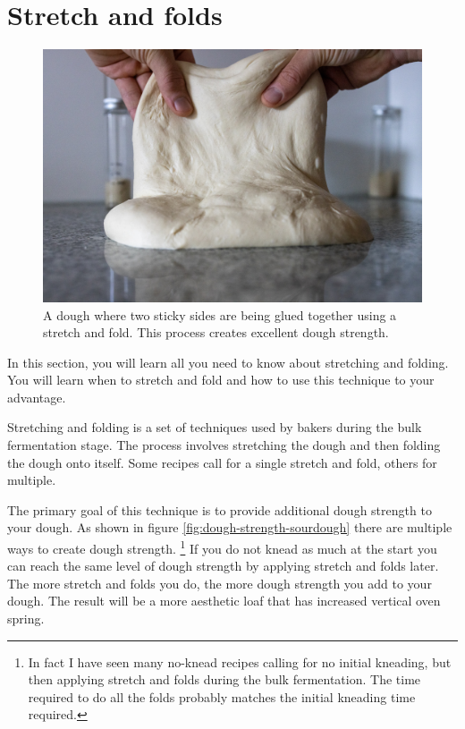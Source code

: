 \section{Stretch and folds}

\begin{figure}[!htb]
  \includegraphics[width=\textwidth]{dough-being-glued}
  \caption{A dough where two sticky sides are being glued together using
  a stretch and fold. This process creates excellent dough strength.}
\end{figure}

In this section, you will learn all you need to know about stretching and
folding. You will learn when to stretch and fold and how to use this technique
to your advantage.

Stretching and folding is a set of techniques used by bakers during the bulk
fermentation stage. The process involves stretching the dough and then
folding the dough onto itself. Some recipes call for a single stretch
and fold, others for multiple.

The primary goal of this technique is to provide
additional dough strength to your dough. As shown in figure \ref{fig:dough-strength-sourdough}
there are multiple ways to create dough strength. \footnote{In fact I have seen many no-knead
recipes calling for no initial kneading, but then applying stretch and folds
during the bulk fermentation. The time required to do all the folds probably
matches the initial kneading time required.} If you do not knead as much at
the start you can reach the same level of dough strength by applying stretch
and folds later. The more stretch and folds you do, the more dough strength
you add to your dough. The result will be a more aesthetic loaf that has
increased vertical oven spring.

